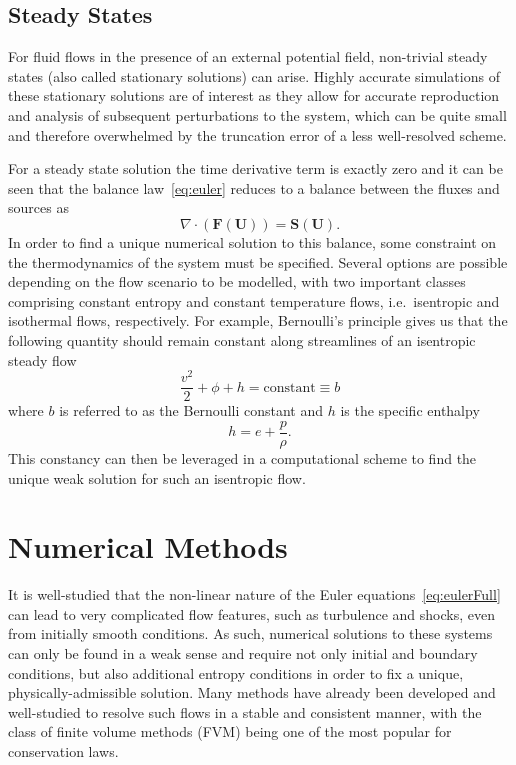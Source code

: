 \subsection{Steady States}

For fluid flows in the presence of an external potential field, non-trivial steady states (also called stationary solutions) can arise. Highly accurate simulations of these stationary solutions are of interest as they allow for accurate reproduction and analysis of subsequent perturbations to the system, which can be quite small and therefore overwhelmed by the truncation error of a less well-resolved scheme.

For a steady state solution the time derivative term is exactly zero and it can be seen that the balance law~\eqref{eq:euler} reduces to a balance between the fluxes and sources as
\begin{equation} \label{eq:balance}
\nabla\cdot(\mathbf{F}(\mathbf{U}))=\mathbf{S}(\mathbf{U}).
\end{equation}
In order to find a unique numerical solution to this balance, some constraint on the thermodynamics of the system must be specified. Several options are possible depending on the flow scenario to be modelled, with two important classes comprising constant entropy and constant temperature flows, i.e.~isentropic and isothermal flows, respectively. For example, Bernoulli's principle gives us that the following quantity should remain constant along streamlines of an isentropic steady flow
\begin{equation} \label{eq:bernoulli_constant}
\frac{v^2}{2}+\phi+h=\textrm{constant}\equiv b
\end{equation}
where $b$ is referred to as the Bernoulli constant and $h$ is the specific enthalpy
\begin{equation} \label{eq:enthalpy}
h=e+\frac{p}{\rho}.
\end{equation}
This constancy can then be leveraged in a computational scheme to find the unique weak solution for such an isentropic flow.


\section{Numerical Methods}
\label{sec:numerics}

It is well-studied that the non-linear nature of the Euler equations~\eqref{eq:eulerFull} can lead to very complicated flow features, such as turbulence and shocks, even from initially smooth conditions. As such, numerical solutions to these systems can only be found in a weak sense and require not only initial and boundary conditions, but also additional entropy conditions in order to fix a unique, physically-admissible solution. Many methods have already been developed and well-studied to resolve such flows in a stable and consistent manner, with the class of finite volume methods (FVM) being one of the most popular for conservation laws.

